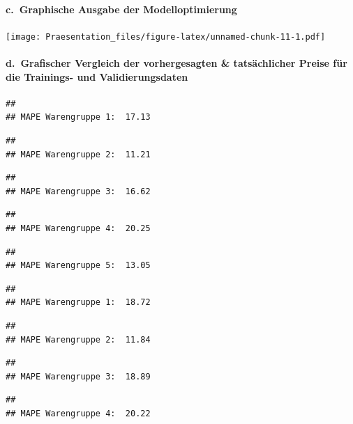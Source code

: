 \documentclass[
]{article}
\begin{document}
\hypertarget{c.-graphische-ausgabe-der-modelloptimierung}{%
\paragraph{c.~Graphische Ausgabe der
Modelloptimierung}\label{c.-graphische-ausgabe-der-modelloptimierung}}

\texttt{[image: Praesentation\_files/figure-latex/unnamed-chunk-11-1.pdf]}

\hypertarget{d.-grafischer-vergleich-der-vorhergesagten-tatsuxe4chlicher-preise-fuxfcr-die-trainings--und-validierungsdaten}{%
\paragraph{d.~Grafischer Vergleich der vorhergesagten \& tatsächlicher
Preise für die Trainings- und
Validierungsdaten}\label{d.-grafischer-vergleich-der-vorhergesagten-tatsuxe4chlicher-preise-fuxfcr-die-trainings--und-validierungsdaten}}

\begin{verbatim}
## 
## MAPE Warengruppe 1:  17.13
\end{verbatim}

\begin{verbatim}
## 
## MAPE Warengruppe 2:  11.21
\end{verbatim}

\begin{verbatim}
## 
## MAPE Warengruppe 3:  16.62
\end{verbatim}

\begin{verbatim}
## 
## MAPE Warengruppe 4:  20.25
\end{verbatim}

\begin{verbatim}
## 
## MAPE Warengruppe 5:  13.05
\end{verbatim}

\begin{verbatim}
## 
## MAPE Warengruppe 1:  18.72
\end{verbatim}

\begin{verbatim}
## 
## MAPE Warengruppe 2:  11.84
\end{verbatim}

\begin{verbatim}
## 
## MAPE Warengruppe 3:  18.89
\end{verbatim}

\begin{verbatim}
## 
## MAPE Warengruppe 4:  20.22
\end{verbatim}
\end{document}
